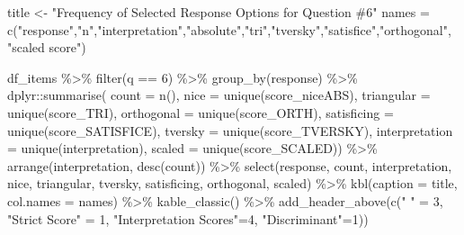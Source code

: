 \documentclass[
  letterpaper,
  DIV=11,
  numbers=noendperiod]{scrreprt}
\newenvironment{Shaded}{\begin{snugshade}}{\end{snugshade}}
\newcommand{\AttributeTok}[1]{\textcolor[rgb]{0.40,0.45,0.13}{#1}}
\newcommand{\DecValTok}[1]{\textcolor[rgb]{0.68,0.00,0.00}{#1}}
\newcommand{\FunctionTok}[1]{\textcolor[rgb]{0.28,0.35,0.67}{#1}}
\newcommand{\NormalTok}[1]{\textcolor[rgb]{0.00,0.23,0.31}{#1}}
\newcommand{\OtherTok}[1]{\textcolor[rgb]{0.00,0.23,0.31}{#1}}
\newcommand{\SpecialCharTok}[1]{\textcolor[rgb]{0.37,0.37,0.37}{#1}}
\newcommand{\StringTok}[1]{\textcolor[rgb]{0.13,0.47,0.30}{#1}}
\begin{document}
\begin{Shaded}
\begin{Highlighting}[]
\NormalTok{title }\OtherTok{\textless{}{-}} \StringTok{"Frequency of Selected Response Options for Question \#6"}
\NormalTok{names }\OtherTok{=} \FunctionTok{c}\NormalTok{(}\StringTok{"response"}\NormalTok{,}\StringTok{"n"}\NormalTok{,}\StringTok{"interpretation"}\NormalTok{,}\StringTok{"absolute"}\NormalTok{,}\StringTok{"tri"}\NormalTok{,}\StringTok{"tversky"}\NormalTok{,}\StringTok{"satisfice"}\NormalTok{,}\StringTok{"orthogonal"}\NormalTok{, }\StringTok{"scaled score"}\NormalTok{)}

\NormalTok{df\_items }\SpecialCharTok{\%\textgreater{}\%} \FunctionTok{filter}\NormalTok{(q }\SpecialCharTok{==} \DecValTok{6}\NormalTok{) }\SpecialCharTok{\%\textgreater{}\%} \FunctionTok{group\_by}\NormalTok{(response) }\SpecialCharTok{\%\textgreater{}\%}
\NormalTok{  dplyr}\SpecialCharTok{::}\FunctionTok{summarise}\NormalTok{( }\AttributeTok{count =} \FunctionTok{n}\NormalTok{(),}
                    \AttributeTok{nice =} \FunctionTok{unique}\NormalTok{(score\_niceABS),}
                    \AttributeTok{triangular =} \FunctionTok{unique}\NormalTok{(score\_TRI),}
                    \AttributeTok{orthogonal =}  \FunctionTok{unique}\NormalTok{(score\_ORTH),}
                    \AttributeTok{satisficing =}  \FunctionTok{unique}\NormalTok{(score\_SATISFICE),}
                    \AttributeTok{tversky =} \FunctionTok{unique}\NormalTok{(score\_TVERSKY),}
                    \AttributeTok{interpretation =} \FunctionTok{unique}\NormalTok{(interpretation),}
                    \AttributeTok{scaled =} \FunctionTok{unique}\NormalTok{(score\_SCALED)) }\SpecialCharTok{\%\textgreater{}\%}
  \FunctionTok{arrange}\NormalTok{(interpretation, }\FunctionTok{desc}\NormalTok{(count)) }\SpecialCharTok{\%\textgreater{}\%}
  \FunctionTok{select}\NormalTok{(response, count, interpretation, nice,}
\NormalTok{         triangular, tversky, satisficing, orthogonal, scaled) }\SpecialCharTok{\%\textgreater{}\%}
  \FunctionTok{kbl}\NormalTok{(}\AttributeTok{caption =}\NormalTok{ title, }\AttributeTok{col.names =}\NormalTok{ names) }\SpecialCharTok{\%\textgreater{}\%}  \FunctionTok{kable\_classic}\NormalTok{() }\SpecialCharTok{\%\textgreater{}\%}
  \FunctionTok{add\_header\_above}\NormalTok{(}\FunctionTok{c}\NormalTok{(}\StringTok{" "} \OtherTok{=} \DecValTok{3}\NormalTok{, }\StringTok{"Strict Score"} \OtherTok{=} \DecValTok{1}\NormalTok{, }\StringTok{"Interpretation Scores"}\OtherTok{=}\DecValTok{4}\NormalTok{, }\StringTok{"Discriminant"}\OtherTok{=}\DecValTok{1}\NormalTok{)) }
\end{Highlighting}
\end{Shaded}
\end{document}
